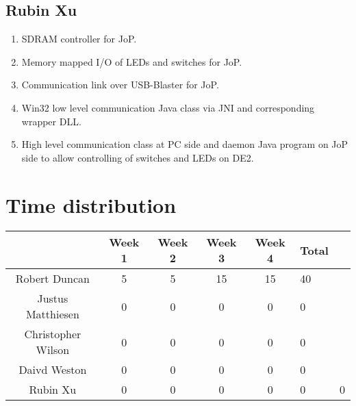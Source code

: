 \documentclass[12pt, a4paper, oneside,titlepage]{article}
\begin{document}
\subsection{Rubin Xu}
\begin{enumerate}
\item SDRAM controller for JoP.
\item Memory mapped I/O of LEDs and switches for JoP.
\item Communication link over USB-Blaster for JoP.
\item Win32 low level communication Java class via JNI and corresponding wrapper DLL.
\item High level communication class at PC side and daemon Java program on JoP side to allow controlling of switches and LEDs on DE2.
\end{enumerate}
\section{Time distribution}
\begin{tabular}{c | c | c | c | c}
& Week 1 & Week 2 & Week 3 & Week 4 & Total\\
\hline
Robert Duncan & 5 & 5 & 15 & 15 & 40\\
\hline
Justus Matthiesen & 0 & 0 & 0 & 0 & 0 \\
\hline
Christopher Wilson & 0 & 0 & 0 & 0 & 0\\
\hline
Daivd Weston & 0 & 0 & 0 & 0 & 0\\
\hline
Rubin Xu & 0 & 0 & 0 & 0 & 0 & 0\\
\end{tabular}
\end{document}
